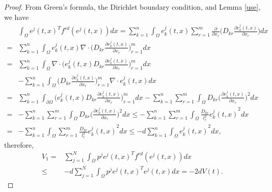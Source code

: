 \documentclass[review]{elsarticle}
\begin{document}
\begin{proof}
From Green's formula, the Dirichlet boundary
condition, and Lemma \ref{use}, we have
\begin{align}
&\int_{\Omega}e^j(t,x)^Tf^{rd}  (e^j(t,x))dx=\sum\limits_{k=1}^n\int_{\Omega}e^j_k(t,x)\sum\limits_{r=1}^m
\frac{\partial}{\partial{x}_r}\bigg(D_{kr}\frac{\partial{e}^j_k(t,x)}{\partial{x}_r}
\bigg)dx\nonumber\\
=&\sum\limits_{k=1}^n\int_{\Omega}e^j_k(t,x)\nabla\cdot\bigg(D_{kr}
\frac{\partial{e}^j_k(t,x)}{\partial{x}_r}\bigg)
_{r=1}^mdx\nonumber\\
=&\sum\limits_{k=1}^n\int_{\Omega}\nabla\cdot\bigg(e^j_k(t,x)D_{kr}
\frac{\partial{e}^j_k(t,x)}{\partial{x}_r}\bigg)
_{r=1}^mdx\nonumber\\
&-\sum\limits_{k=1}^n\int_{\Omega}
\bigg(D_{kr}\frac{\partial{e}^j_k(t,x)}{\partial{x}_r}\bigg)
_{r=1}^m\nabla\cdot e^j_k(t,x)dx\nonumber\\
=&\sum\limits_{k=1}^n\int_{\partial{\Omega}}
\bigg(e^j_k(t,x)D_{kr}\frac{\partial{e}^j_k(t,x)}{\partial{x}_r}\bigg)
_{r=1}^mdx-\sum\limits_{k=1}^n\sum\limits_{r=1}^m\int_{\Omega}D_{kr}
\bigg(\frac{\partial{e}^j_k(t,x)}{\partial{x}_r}
\bigg)^2dx\nonumber\\
=&-\sum\limits_{k=1}^n\sum\limits_{r=1}^m\int_{\Omega}D_{kr}
\bigg(\frac{\partial{e}^j_k(t,x)}{\partial{x}_r}
\bigg)^2dx\leq -\sum\limits_{k=1}^n\sum\limits_{r=1}^m\int_{\Omega}\frac{D_{kr}}{l_r^2}
{{e}^j_k(t,x)}^2dx\nonumber\\
=&-\sum\limits_{k=1}^n\int_{\Omega}\sum\limits_{r=1}^m\frac{D_{kr}}{l_r^2}
{{e}^j_k(t,x)}^2dx\le -d\sum\limits_{k=1}^n\int_{\Omega}
{{e}^j_k(t,x)}^2dx,\nonumber
\end{align}
therefore,
\begin{align}\label{v1}
V_1=&\sum\limits_{j=1}^N\int_{\Omega}p^je^j(t,x)^Tf^{rd}(e^j(t,x))dx\nonumber\\
\le &-d\sum\limits_{j=1}^N\int_{\Omega}p^je^j(t,x)^Te^j(t,x)dx=-2dV(t).
\end{align}


\end{proof}
\end{document}
